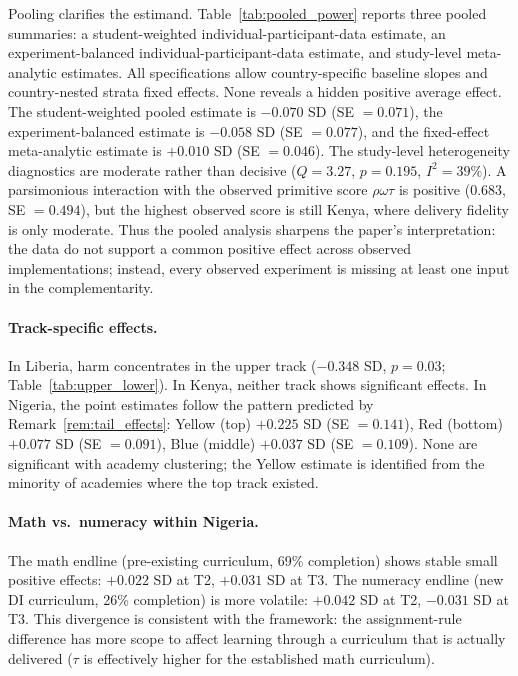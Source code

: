 \documentclass[11pt]{article}
\begin{document}
Pooling clarifies the estimand. Table~\ref{tab:pooled_power} reports three pooled summaries: a student-weighted individual-participant-data estimate, an experiment-balanced individual-participant-data estimate, and study-level meta-analytic estimates. All specifications allow country-specific baseline slopes and country-nested strata fixed effects. None reveals a hidden positive average effect. The student-weighted pooled estimate is $-0.070$ SD (SE $=0.071$), the experiment-balanced estimate is $-0.058$ SD (SE $=0.077$), and the fixed-effect meta-analytic estimate is $+0.010$ SD (SE $=0.046$). The study-level heterogeneity diagnostics are moderate rather than decisive ($Q=3.27$, $p=0.195$, $I^2=39\%$). A parsimonious interaction with the observed primitive score $\rho\omega\tau$ is positive ($0.683$, SE $=0.494$), but the highest observed score is still Kenya, where delivery fidelity is only moderate. Thus the pooled analysis sharpens the paper's interpretation: the data do not support a common positive effect across observed implementations; instead, every observed experiment is missing at least one input in the complementarity.

\paragraph{Track-specific effects.} In Liberia, harm concentrates in the upper track ($-0.348$ SD, $p = 0.03$; Table~\ref{tab:upper_lower}). In Kenya, neither track shows significant effects. In Nigeria, the point estimates follow the pattern predicted by Remark~\ref{rem:tail_effects}: Yellow (top) $+0.225$ SD (SE $= 0.141$), Red (bottom) $+0.077$ SD (SE $= 0.091$), Blue (middle) $+0.037$ SD (SE $= 0.109$). None are significant with academy clustering; the Yellow estimate is identified from the minority of academies where the top track existed.

\paragraph{Math vs.\ numeracy within Nigeria.} The math endline (pre-existing curriculum, 69\% completion) shows stable small positive effects: $+0.022$ SD at T2, $+0.031$ SD at T3. The numeracy endline (new DI curriculum, 26\% completion) is more volatile: $+0.042$ SD at T2, $-0.031$ SD at T3. This divergence is consistent with the framework: the assignment-rule difference has more scope to affect learning through a curriculum that is actually delivered ($\tau$ is effectively higher for the established math curriculum).
\end{document}
